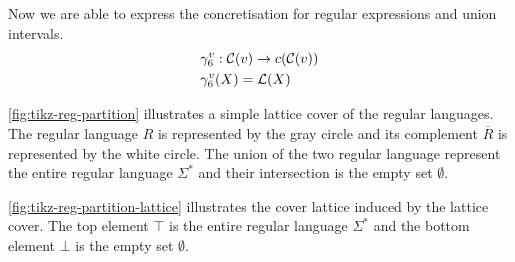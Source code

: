 Now we are able to express the concretisation for regular expressions and union intervals.
\begin{align}
    &\gamma^v_6 : \mathcal{C}(v) \rightarrow c(\mathcal{C}(v)) \\
    &\gamma^v_6(X) = \mathcal{L}(X)
\end{align}

%


\begin{example}
    \autoref{fig:tikz-reg-partition} illustrates a simple lattice cover of the regular languages.
    The regular language $R$ is represented by the gray circle and its complement $\overline{R}$ is represented by the white circle.
    The union of the two regular language represent the entire regular language $\Sigma^*$ and their intersection is the empty set $\emptyset$.

    \autoref{fig:tikz-reg-partition-lattice} illustrates the cover lattice induced by the lattice cover.
    The top element $\top$ is the entire regular language $\Sigma^*$ and the bottom element $\bot$ is the empty set $\emptyset$.
\end{example}

